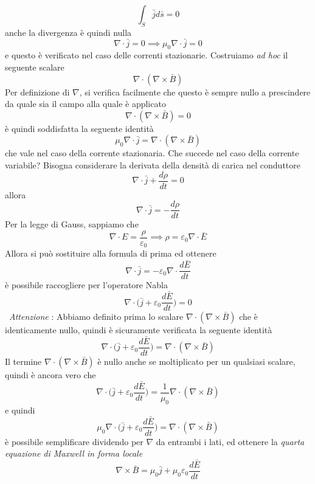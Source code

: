 \documentclass[10pt, letterpaper]{report}
\begin{document}
$$ \int_S \bar j d\bar s = 0$$
anche la divergenza è quindi nulla 
$$  \nabla \cdot \bar j=0\implies  \mu_0\nabla \cdot \bar j=0$$
e questo è verificato nel caso delle correnti stazionarie.  Costruiamo \textit{ad hoc} il seguente scalare 
$$ \nabla \cdot (\nabla \times \bar B)$$
Per definizione di $\nabla$, si verifica facilmente che questo è sempre nullo a prescindere da quale sia il campo alla quale è applicato 
$$ \nabla \cdot (\nabla \times \bar B)=0$$
è quindi soddisfatta la seguente identità
$$\mu_0\nabla \cdot \bar j= \nabla \cdot (\nabla \times \bar B) $$
che vale nel caso della corrente stazionaria.\acc 
Che succede nel caso della corrente variabile? Bisogna considerare la derivata della densità di carica nel conduttore
$$ \nabla \cdot \bar j + \frac{d\rho}{dt}=0$$
allora 
$$ \nabla \cdot \bar j = -\frac{d\rho}{dt}$$
Per la legge di Gauss, sappiamo che 
$$ \nabla \cdot E = \frac{\rho}{\varepsilon_0}\implies \rho = \varepsilon_0 \nabla \cdot \bar E$$
Allora si può sostituire alla formula di prima ed ottenere 
$$ \nabla \cdot \bar j = -\varepsilon_0 \nabla \cdot\frac{d\bar E}{dt}$$
è possibile raccogliere per l'operatore Nabla 
$$ \nabla\cdot \Big( \bar j + \varepsilon_0\frac{d\bar E}{dt}\Big)=0$$\
\textit{Attenzione} : Abbiamo definito prima lo scalare 
$\nabla \cdot (\nabla \times \bar B)$ che è identicamente nullo, quindi è sicuramente verificata la seguente identità
$$ \nabla\cdot \Big( \bar j + \varepsilon_0\frac{d\bar E}{dt}\Big)=\nabla \cdot (\nabla \times \bar B)$$
Il termine $\nabla \cdot (\nabla \times \bar B)$ è nullo anche se moltiplicato per un qualsiasi scalare, quindi è ancora vero che 
$$ \nabla\cdot \Big( \bar j + \varepsilon_0\frac{d\bar E}{dt}\Big)=\frac{1}{\mu_0}\nabla \cdot (\nabla \times \bar B)$$ 
e quindi 
$$ \mu_0\nabla\cdot \Big( \bar j + \varepsilon_0\frac{d\bar E}{dt}\Big)=\nabla \cdot (\nabla \times \bar B)$$
è possibile semplificare dividendo per  $\nabla$ da entrambi i lati, ed ottenere la \textit{quarta equazione di Maxwell in forma locale} 
$$\nabla \times \bar B = \mu_0\bar j + \mu_0\varepsilon_0\frac{d \bar E}{d t}$$
\flowerLine 
\end{document}
